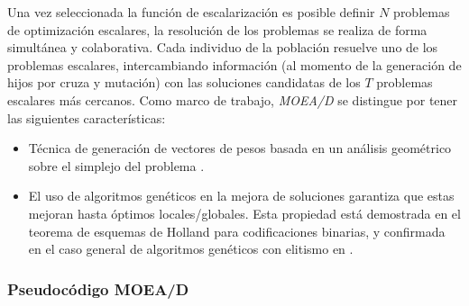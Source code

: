 \documentclass[letterpaper,10pt]{article}
\begin{document}
Una vez seleccionada la función de escalarización es posible definir $N$ problemas de optimización escalares, la resolución de los problemas se realiza de forma simultánea
y colaborativa. Cada individuo de la población resuelve uno de los problemas escalares, intercambiando información (al momento de la generación de hijos por cruza y mutación) con las soluciones candidatas de los $T$ problemas escalares más cercanos.
Como marco de trabajo, \emph{MOEA/D} se distingue por tener las siguientes características:

 \begin{itemize}
 \item Técnica de generación de vectores de pesos basada en un análisis geométrico sobre el simplejo del problema \cite{mie99,Das:1998:NIN:588907.589322, Messac2003}.
 \item El uso de algoritmos genéticos en la mejora de soluciones garantiza que estas mejoran hasta óptimos locales/globales. Esta propiedad está demostrada en el teorema de esquemas de Holland \cite{Holland:1992:ANA:531075} para codificaciones binarias, y confirmada en el caso general de algoritmos genéticos con elitismo en \cite{rudolph1994convergence}.
 \end{itemize}


\subsubsection{Pseudocódigo MOEA/D}

\end{document}
